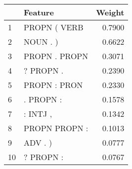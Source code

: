 \begin{tabular}{llr}
\toprule
{} &        Feature &  Weight \\
\midrule
1  &   PROPN ( VERB &  0.7900 \\
2  &       NOUN . ) &  0.6622 \\
3  &  PROPN . PROPN &  0.3071 \\
4  &      ? PROPN . &  0.2390 \\
5  &   PROPN : PRON &  0.2330 \\
6  &      . PROPN : &  0.1578 \\
7  &       : INTJ , &  0.1342 \\
8  &  PROPN PROPN : &  0.1013 \\
9  &        ADV . ) &  0.0777 \\
10 &      ? PROPN : &  0.0767 \\
\bottomrule
\end{tabular}
